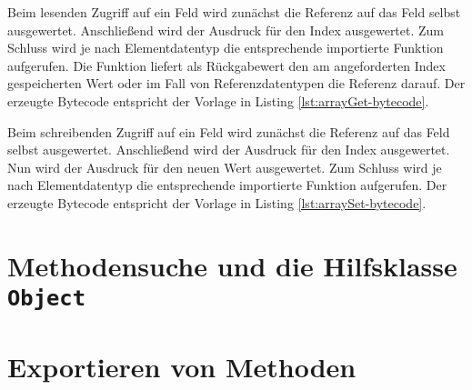 Beim lesenden Zugriff auf ein Feld wird zunächst die Referenz auf das Feld selbst ausgewertet. Anschließend wird der Ausdruck für den Index ausgewertet. Zum Schluss wird je nach Elementdatentyp die entsprechende importierte Funktion aufgerufen. Die Funktion liefert als Rückgabewert den am angeforderten Index gespeicherten Wert oder im Fall von Referenzdatentypen die Referenz darauf. Der erzeugte Bytecode entspricht der Vorlage in Listing \ref{lst:arrayGet-bytecode}.



Beim schreibenden Zugriff auf ein Feld wird zunächst die Referenz auf das Feld selbst ausgewertet. Anschließend wird der Ausdruck für den Index ausgewertet. Nun wird der Ausdruck für den neuen Wert ausgewertet. Zum Schluss wird je nach Elementdatentyp die entsprechende importierte Funktion aufgerufen. Der erzeugte Bytecode entspricht der Vorlage in Listing \ref{lst:arraySet-bytecode}.



\section{Methodensuche und die Hilfsklasse \lstinline{Object}}

\section{Exportieren von Methoden}
